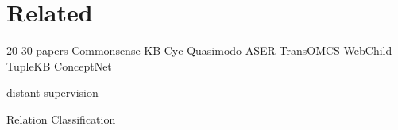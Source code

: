 \section{Related}
\label{sec:related}
20-30 papers
Commonsense KB
Cyc \cite{lenat1995cyc}
Quasimodo \cite{romero2019commonsense}
ASER \cite{zhang2019aser}
TransOMCS \cite{zhang2020transomcs}
WebChild \cite{tandon2017webchild}
TupleKB \cite{mishra2017domain}
ConceptNet \cite{speer2017conceptnet}

distant supervision
\cite{mintz2009distant}
\cite{hoffmann2011knowledge}
\cite{riedel2010modeling}

Relation Classification
\cite{zeng2014relation}
\cite{zeng2015distant}
\cite{lin2016neural}
\cite{ji2017distant}
\cite{liu2017soft}
